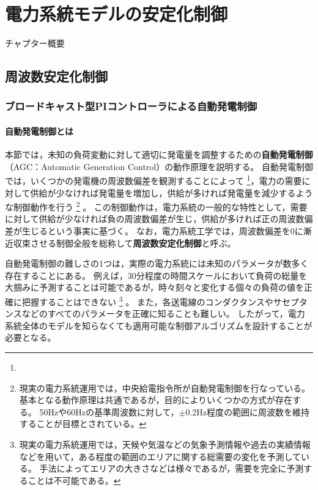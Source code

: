 \documentclass[tombow,dvipdfmx]{corona-a5-1.1}
\begin{document}
\chapter{電力系統モデルの安定化制御}

チャプター概要

\section{周波数安定化制御}
\subsection{ブロードキャスト型PIコントローラによる自動発電制御}


\subsubsection{自動発電制御とは}

本節では，未知の負荷変動に対して適切に発電量を調整するための\textbf{自動発電制御}（AGC：Automatic Generation Control）の動作原理を説明する。
自動発電制御では，いくつかの発電機の周波数偏差を観測することによって
\footnote{
}，電力の需要に対して供給が少なければ発電量を増加し，供給が多ければ発電量を減少するような制御動作を行う
\footnote{
現実の電力系統運用では，中央給電指令所が自動発電制御を行なっている。
基本となる動作原理は共通であるが，目的によりいくつかの方式が存在する。
50Hzや60Hzの基準周波数に対して，$\pm$0.2Hz程度の範囲に周波数を維持することが目標とされている。
}
。
この制御動作は，電力系統の一般的な特性として，需要に対して供給が少なければ負の周波数偏差が生じ，供給が多ければ正の周波数偏差が生じるという事実に基づく。
なお，電力系統工学では，周波数偏差を0に漸近収束させる制御全般を総称して\textbf{周波数安定化制御}と呼ぶ。

自動発電制御の難しさの1つは，実際の電力系統には未知のパラメータが数多く存在することにある。
例えば，30分程度の時間スケールにおいて負荷の総量を大掴みに予測することは可能であるが，時々刻々と変化する個々の負荷の値を正確に把握することはできない
\footnote{
現実の電力系統運用では，天候や気温などの気象予測情報や過去の実績情報などを用いて，ある程度の範囲のエリアに関する総需要の変化を予測している。
手法によってエリアの大きさなどは様々であるが，需要を完全に予測することは不可能である。
}
。
また，各送電線のコンダクタンスやサセプタンスなどのすべてのパラメータを正確に知ることも難しい。
したがって，電力系統全体のモデルを知らなくても適用可能な制御アルゴリズムを設計することが必要となる。
\end{document}

